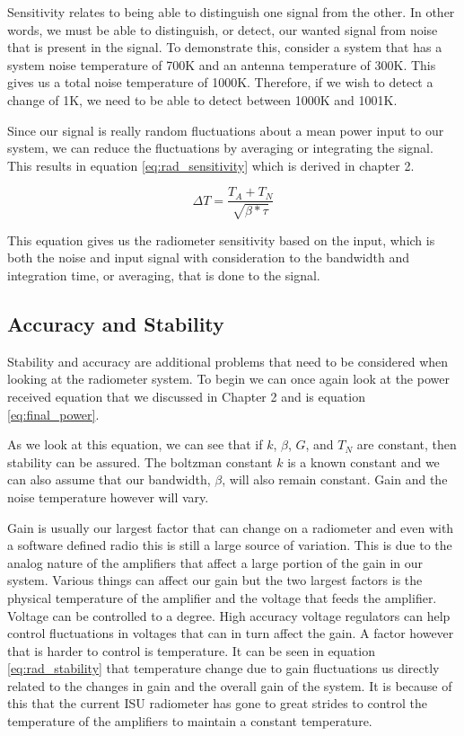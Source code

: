 Sensitivity relates to being able to distinguish one signal from the other.  In other words, we must be able to distinguish, or detect, our wanted signal from noise that is present in the signal.  To demonstrate this, consider a system that has a system noise temperature of 700K and an antenna temperature of 300K.  This gives us a total noise temperature of 1000K.  Therefore, if we wish to detect a change of 1K, we need to be able to detect between 1000K and 1001K.

Since our signal is really random fluctuations about a mean power input to our system, we can reduce the fluctuations by averaging or integrating the signal.  This results in equation \ref{eq:rad_sensitivity} which is derived in chapter 2.

\begin{equation} \label{eq:rad_sensitivity}
\Delta T=\frac{T_{A}+T_{N}}{\sqrt{\beta * \tau}}
\end{equation}


This equation gives us the radiometer sensitivity based on the input, which is both the noise and input signal with consideration to the bandwidth and integration time, or averaging, that is done to the signal.  

\subsection{Accuracy and Stability}
Stability and accuracy are additional problems that need to be considered when looking at the radiometer system.  To begin we can once again look at the power received equation that we discussed in Chapter 2 and is equation \ref{eq:final_power}.

As we look at this equation, we can see that if $k$, $\beta$, $G$, and $T_{N}$ are constant, then stability can be assured.  The boltzman constant $k$ is a known constant and we can also assume that our bandwidth, $\beta$, will also remain constant.  Gain and the noise temperature however will vary.  

Gain is usually our largest factor that can change on a radiometer and even with a software defined radio this is still a large source of variation.  This is due to the analog nature of the amplifiers that affect a large portion of the gain in our system.  Various things can affect our gain but the two largest factors is the physical temperature of the amplifier and the voltage that feeds the amplifier.  Voltage can be controlled to a degree.  High accuracy voltage regulators can help control fluctuations in voltages that can in turn affect the gain.  A factor however that is harder to control is temperature.  It can be seen in equation \ref{eq:rad_stability} that temperature change due to gain fluctuations us directly related to the changes in gain and the overall gain of the system. It is because of this that the current ISU radiometer has gone to great strides to control the temperature of the amplifiers to maintain a constant temperature.

